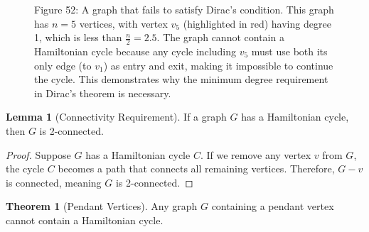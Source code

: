 \documentclass{article}
\theoremstyle{definition}
\newtheorem{theorem}{Theorem}
\newtheorem{lemma}{Lemma}
\begin{document}
\begin{figure}[h!]
\begin{center}
\end{center}

\begin{center}
\small Figure 52: A graph that fails to satisfy Dirac's condition. This graph has $n = 5$ vertices, with vertex $v_5$ (highlighted in red) having degree 1, which is less than $\frac{n}{2} = 2.5$. The graph cannot contain a Hamiltonian cycle because any cycle including $v_5$ must use both its only edge (to $v_1$) as entry and exit, making it impossible to continue the cycle. This demonstrates why the minimum degree requirement in Dirac's theorem is necessary.
\end{center}
\end{figure}

\begin{lemma}[Connectivity Requirement]
If a graph $G$ has a Hamiltonian cycle, then $G$ is 2-connected.
\end{lemma}

\begin{proof}
Suppose $G$ has a Hamiltonian cycle $C$. If we remove any vertex $v$ from $G$, the cycle $C$ becomes a path that connects all remaining vertices. Therefore, $G-v$ is connected, meaning $G$ is 2-connected.
\end{proof}

\begin{theorem}[Pendant Vertices]
Any graph $G$ containing a pendant vertex cannot contain a Hamiltonian cycle.
\end{theorem}
\end{document}
